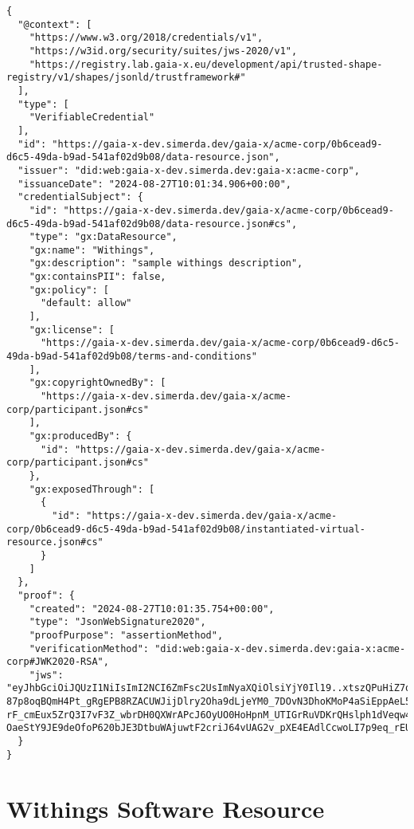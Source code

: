 \begin{verbatim}
{
  "@context": [
    "https://www.w3.org/2018/credentials/v1",
    "https://w3id.org/security/suites/jws-2020/v1",
    "https://registry.lab.gaia-x.eu/development/api/trusted-shape-registry/v1/shapes/jsonld/trustframework#"
  ],
  "type": [
    "VerifiableCredential"
  ],
  "id": "https://gaia-x-dev.simerda.dev/gaia-x/acme-corp/0b6cead9-d6c5-49da-b9ad-541af02d9b08/data-resource.json",
  "issuer": "did:web:gaia-x-dev.simerda.dev:gaia-x:acme-corp",
  "issuanceDate": "2024-08-27T10:01:34.906+00:00",
  "credentialSubject": {
    "id": "https://gaia-x-dev.simerda.dev/gaia-x/acme-corp/0b6cead9-d6c5-49da-b9ad-541af02d9b08/data-resource.json#cs",
    "type": "gx:DataResource",
    "gx:name": "Withings",
    "gx:description": "sample withings description",
    "gx:containsPII": false,
    "gx:policy": [
      "default: allow"
    ],
    "gx:license": [
      "https://gaia-x-dev.simerda.dev/gaia-x/acme-corp/0b6cead9-d6c5-49da-b9ad-541af02d9b08/terms-and-conditions"
    ],
    "gx:copyrightOwnedBy": [
      "https://gaia-x-dev.simerda.dev/gaia-x/acme-corp/participant.json#cs"
    ],
    "gx:producedBy": {
      "id": "https://gaia-x-dev.simerda.dev/gaia-x/acme-corp/participant.json#cs"
    },
    "gx:exposedThrough": [
      {
        "id": "https://gaia-x-dev.simerda.dev/gaia-x/acme-corp/0b6cead9-d6c5-49da-b9ad-541af02d9b08/instantiated-virtual-resource.json#cs"
      }
    ]
  },
  "proof": {
    "created": "2024-08-27T10:01:35.754+00:00",
    "type": "JsonWebSignature2020",
    "proofPurpose": "assertionMethod",
    "verificationMethod": "did:web:gaia-x-dev.simerda.dev:gaia-x:acme-corp#JWK2020-RSA",
    "jws": "eyJhbGciOiJQUzI1NiIsImI2NCI6ZmFsc2UsImNyaXQiOlsiYjY0Il19..xtszQPuHiZ7qztSo2rBIJCW_O6BKbuXmacqMJIL_VhB1PySU1J3lq-87p8oqBQmH4Pt_gRgEPB8RZACUWJijDlry2Oha9dLjeYM0_7DOvN3DhoKMoP4aSiEppAeL5Gvud1sPGcorOr_ngBko-rF_cmEux5ZrQ3I7vF3Z_wbrDH0QXWrAPcJ6OyUO0HoHpnM_UTIGrRuVDKrQHslph1dVeqw45BxtPd2Pu3vfKkcQhOAT3207H2nE-OaeStY9JE9deOfoP620bJE3DtbuWAjuwtF2criJ64vUAG2v_pXE4EAdlCcwoLI7p9eq_rEU9gdjRayypjQpgxg0nBoPZi3Okw"
  }
}
\end{verbatim}


\section{Withings Software Resource}

